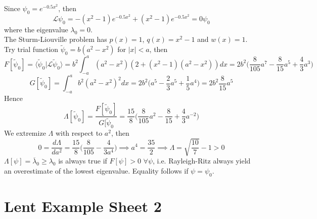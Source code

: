 \documentclass[a4paper]{article}
\begin{document}
\begin{ans}Since $\psi_0=e^{-0.5x^2}$, then
$$\mathcal{L}\psi_0=-(x^2-1)e^{-0.5x^2}+(x^2-1)e^{-0.5x^2}=0\psi_0$$
where the eigenvalue $\lambda_0=0$.\\[5pt]
The Sturm-Liouville problem has $p(x)=1$, $q(x)=x^2-1$ and $w(x)=1$. Try trial function $\tilde{\psi}_0=b(a^2-x^2)$ for $|x|<a$, then
$$F[\tilde{\psi}_0]=\langle\tilde{\psi}_0|\mathcal{L}\tilde{\psi}_0\rangle=b^2\int_{-a}^a(a^2-x^2)(2+(x^2-1)(a^2-x^2))dx=2b^2\bigg(\frac{8}{105}a^7-\frac{8}{15}a^5+\frac{4}{3}a^3\bigg)$$
$$G[\tilde{\psi}_0]=\int_{-a}^ab^2(a^2-x^2)^2dx=2b^2\bigg(a^5-\frac{2}{3}a^5+\frac{1}{5}a^4\bigg)=2b^2\frac{8}{15}a^5$$
Hence 
$$\Lambda[\tilde{\psi}_0]=\frac{F[\tilde{\psi}_0]}{G[\tilde{\psi}_0}=\frac{15}{8}\bigg(\frac{8}{105}a^2-\frac{8}{15}+\frac{4}{3}a^{-2}\bigg)$$
We extremize $\Lambda$ with respect to $a^2$, then
$$0=\frac{d\Lambda}{da^2}=\frac{15}{8}\bigg(\frac{8}{105}-\frac{4}{3a^4}\bigg)\implies a^4=\frac{35}{2}\implies\Lambda=\sqrt{\frac{10}{7}}-1>0$$
$\Lambda[\psi]=\overline{\lambda}_0\geq\lambda_0$ is always true if $F[\psi]>0$ $\forall\psi$, i.e. Rayleigh-Ritz always yield an overestimate of the lowest eigenvalue. Equality follows if $\psi=\psi_0$.
\end{ans}
\newpage
\section{Lent Example Sheet 2}
\end{document}
